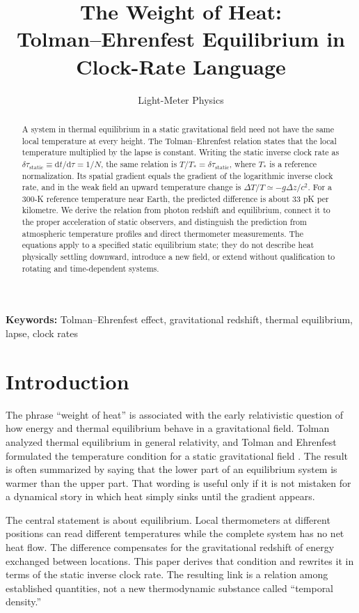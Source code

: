 \documentclass[12pt]{article}
\title{The Weight of Heat:\\
Tolman--Ehrenfest Equilibrium in Clock-Rate Language}
\author{Light-Meter Physics}
\date{}
\begin{document}
\maketitle

\begin{abstract}
A system in thermal equilibrium in a static gravitational field need not have the same local temperature at every height. The Tolman--Ehrenfest relation states that the local temperature multiplied by the lapse is constant. Writing the static inverse clock rate as $\delta\tau_{\mathrm{static}}\equiv\mathrm{d}t/\mathrm{d}\tau=1/N$, the same relation is $T/T_*=\delta\tau_{\mathrm{static}}$, where $T_*$ is a reference normalization. Its spatial gradient equals the gradient of the logarithmic inverse clock rate, and in the weak field an upward temperature change is $\Delta T/T\simeq-g\Delta z/c^2$. For a 300-K reference temperature near Earth, the predicted difference is about 33 pK per kilometre. We derive the relation from photon redshift and equilibrium, connect it to the proper acceleration of static observers, and distinguish the prediction from atmospheric temperature profiles and direct thermometer measurements. The equations apply to a specified static equilibrium state; they do not describe heat physically settling downward, introduce a new field, or extend without qualification to rotating and time-dependent systems.
\end{abstract}

\noindent\textbf{Keywords:} Tolman--Ehrenfest effect, gravitational redshift, thermal equilibrium, lapse, clock rates

\section{Introduction}

The phrase ``weight of heat'' is associated with the early relativistic question of how energy and thermal equilibrium behave in a gravitational field. Tolman analyzed thermal equilibrium in general relativity, and Tolman and Ehrenfest formulated the temperature condition for a static gravitational field \cite{Tolman1930,TolmanEhrenfest1930}. The result is often summarized by saying that the lower part of an equilibrium system is warmer than the upper part. That wording is useful only if it is not mistaken for a dynamical story in which heat simply sinks until the gradient appears.

The central statement is about equilibrium. Local thermometers at different positions can read different temperatures while the complete system has no net heat flow. The difference compensates for the gravitational redshift of energy exchanged between locations. This paper derives that condition and rewrites it in terms of the static inverse clock rate. The resulting link is a relation among established quantities, not a new thermodynamic substance called ``temporal density.''
\end{document}
